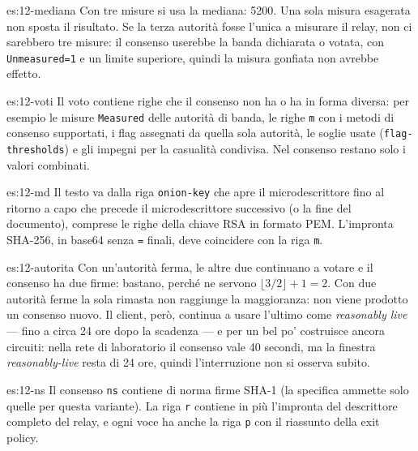 \begin{soluzione}{es:12-mediana}
Con tre misure si usa la mediana: 5200. Una sola misura esagerata non sposta il risultato. Se la terza autorità fosse l'unica a misurare il relay, non ci sarebbero tre misure: il consenso userebbe la banda dichiarata o votata, con \texttt{Unmeasured=1} e un limite superiore, quindi la misura gonfiata non avrebbe effetto.
\end{soluzione}

\begin{soluzione}{es:12-voti}
Il voto contiene righe che il consenso non ha o ha in forma diversa: per esempio le misure \texttt{Measured} delle autorità di banda, le righe \texttt{m} con i metodi di consenso supportati, i flag assegnati da quella sola autorità, le soglie usate (\texttt{flag-thresholds}) e gli impegni per la casualità condivisa. Nel consenso restano solo i valori combinati.
\end{soluzione}

\begin{soluzione}{es:12-md}
Il testo va dalla riga \texttt{onion-key} che apre il microdescrittore fino al ritorno a capo che precede il microdescrittore successivo (o la fine del documento), comprese le righe della chiave RSA in formato PEM. L'impronta SHA-256, in base64 senza \texttt{=} finali, deve coincidere con la riga \texttt{m}.
\end{soluzione}

\begin{soluzione}{es:12-autorita}
Con un'autorità ferma, le altre due continuano a votare e il consenso ha due firme: bastano, perché ne servono $\lfloor 3/2 \rfloor + 1 = 2$. Con due autorità ferme la sola rimasta non raggiunge la maggioranza: non viene prodotto un consenso nuovo. Il client, però, continua a usare l'ultimo come \emph{reasonably live} — fino a circa 24 ore dopo la scadenza — e per un bel po' costruisce ancora circuiti: nella rete di laboratorio il consenso vale 40 secondi, ma la finestra \emph{reasonably-live} resta di 24 ore, quindi l'interruzione non si osserva subito.
\end{soluzione}

\begin{soluzione}{es:12-ns}
Il consenso \texttt{ns} contiene di norma firme SHA-1 (la specifica ammette solo quelle per questa variante). La riga \texttt{r} contiene in più l'impronta del descrittore completo del relay, e ogni voce ha anche la riga \texttt{p} con il riassunto della exit policy.
\end{soluzione}

